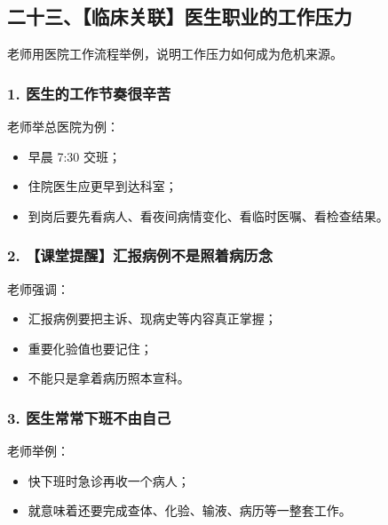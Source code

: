 \documentclass[
  chinese,
  9pt,
  a4paper,
]{ctexart}
\providecommand{\tightlist}{%
  \setlength{\itemsep}{0pt}\setlength{\parskip}{0pt}}
\begin{document}
\subsection{二十三、【临床关联】医生职业的工作压力}\label{ux4e8cux5341ux4e09ux4e34ux5e8aux5173ux8054ux533bux751fux804cux4e1aux7684ux5de5ux4f5cux538bux529b}

老师用医院工作流程举例，说明工作压力如何成为危机来源。

\subsubsection{1.
医生的工作节奏很辛苦}\label{ux533bux751fux7684ux5de5ux4f5cux8282ux594fux5f88ux8f9bux82e6}

老师举总医院为例：

\begin{itemize}
\tightlist
\item
  早晨 7:30 交班；
\item
  住院医生应更早到达科室；
\item
  到岗后要先看病人、看夜间病情变化、看临时医嘱、看检查结果。
\end{itemize}

\subsubsection{2.
【课堂提醒】汇报病例不是照着病历念}\label{ux8bfeux5802ux63d0ux9192ux6c47ux62a5ux75c5ux4f8bux4e0dux662fux7167ux7740ux75c5ux5386ux5ff5}

老师强调：

\begin{itemize}
\tightlist
\item
  汇报病例要把主诉、现病史等内容真正掌握；
\item
  重要化验值也要记住；
\item
  不能只是拿着病历照本宣科。
\end{itemize}

\subsubsection{3.
医生常常下班不由自己}\label{ux533bux751fux5e38ux5e38ux4e0bux73edux4e0dux7531ux81eaux5df1}

老师举例：

\begin{itemize}
\tightlist
\item
  快下班时急诊再收一个病人；
\item
  就意味着还要完成查体、化验、输液、病历等一整套工作。
\end{itemize}
\end{document}
